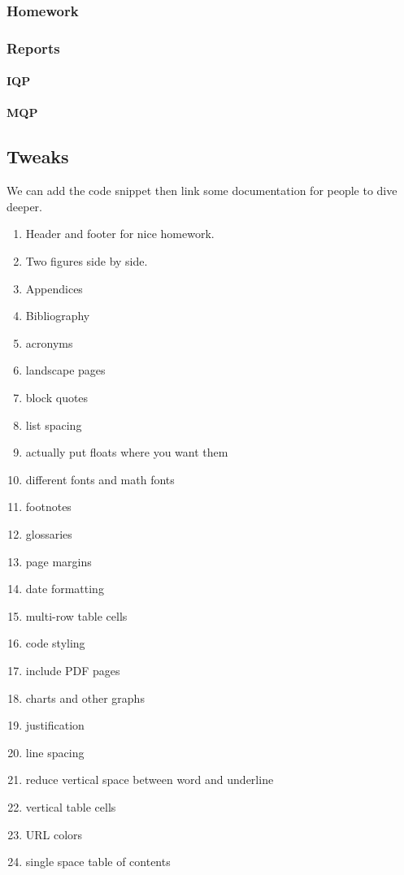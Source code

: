 \documentclass[12pt]{article}
\begin{document}
\subsubsection{Homework}%
\label{bbs.preambles.homework}

\subsubsection{Reports}%
\label{bbs.preambles.reports}

\paragraph{IQP}%
\label{bbs.preambles.reports.iqp}

\paragraph{MQP}%
\label{bbs.preambles.reports.mqp}

\subsection{Tweaks}%
\label{bbs.tweaks}

We can add the code snippet then link some documentation for people to dive deeper.

\begin{enumerate}
  \item Header and footer for nice homework.
  \item Two figures side by side.
  \item Appendices
  \item Bibliography
  \item acronyms
  \item landscape pages
  \item block quotes
  \item list spacing
  \item actually put floats where you want them
  \item different fonts and math fonts
  \item footnotes
  \item glossaries
  \item page margins
  \item date formatting
  \item multi-row table cells
  \item code styling
  \item include PDF pages
  \item charts and other graphs
  \item justification
  \item line spacing
  \item reduce vertical space between word and underline
  \item vertical table cells
  \item URL colors
  \item single space table of contents
\end{enumerate}
\end{document}
